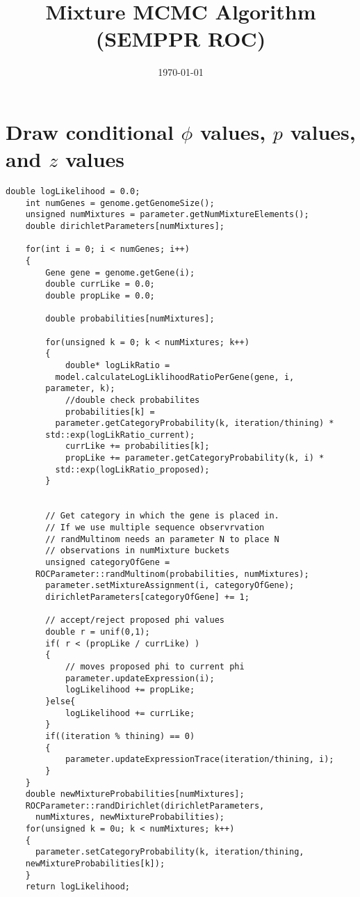 \documentclass[11pt]{article}
\begin{document}
  \title{Mixture MCMC Algorithm (SEMPPR ROC)}
  \date{\today}
  \maketitle
  
  \section{Draw conditional $\phi$ values, $p$ values, and $z$ values}
  
  \begin{lstlisting}[frame=single]
    double logLikelihood = 0.0;
    int numGenes = genome.getGenomeSize();
    unsigned numMixtures = parameter.getNumMixtureElements();
    double dirichletParameters[numMixtures];
    
    for(int i = 0; i < numGenes; i++)
    {
        Gene gene = genome.getGene(i);
        double currLike = 0.0;
        double propLike = 0.0;

        double probabilities[numMixtures];

        for(unsigned k = 0; k < numMixtures; k++)
        {
            double* logLikRatio = 
	      model.calculateLogLiklihoodRatioPerGene(gene, i, 
		parameter, k);
            //double check probabilites
            probabilities[k] = 
	      parameter.getCategoryProbability(k, iteration/thining) * 
		std::exp(logLikRatio_current);
            currLike += probabilities[k];
            propLike += parameter.getCategoryProbability(k, i) * 
	      std::exp(logLikRatio_proposed);
        }


        // Get category in which the gene is placed in.
        // If we use multiple sequence observrvation 
        // randMultinom needs an parameter N to place N 
        // observations in numMixture buckets
        unsigned categoryOfGene = 
	  ROCParameter::randMultinom(probabilities, numMixtures);
        parameter.setMixtureAssignment(i, categoryOfGene);
        dirichletParameters[categoryOfGene] += 1;

        // accept/reject proposed phi values
        double r = unif(0,1);
        if( r < (propLike / currLike) )
        {
            // moves proposed phi to current phi
            parameter.updateExpression(i);
            logLikelihood += propLike;
        }else{
            logLikelihood += currLike;
        }
        if((iteration % thining) == 0)
        {
            parameter.updateExpressionTrace(iteration/thining, i);
        }
    }
    double newMixtureProbabilities[numMixtures];
    ROCParameter::randDirichlet(dirichletParameters, 
      numMixtures, newMixtureProbabilities);
    for(unsigned k = 0u; k < numMixtures; k++)
    {
      parameter.setCategoryProbability(k, iteration/thining, 
	newMixtureProbabilities[k]);
    }
    return logLikelihood;
  \end{lstlisting}
\end{document}
